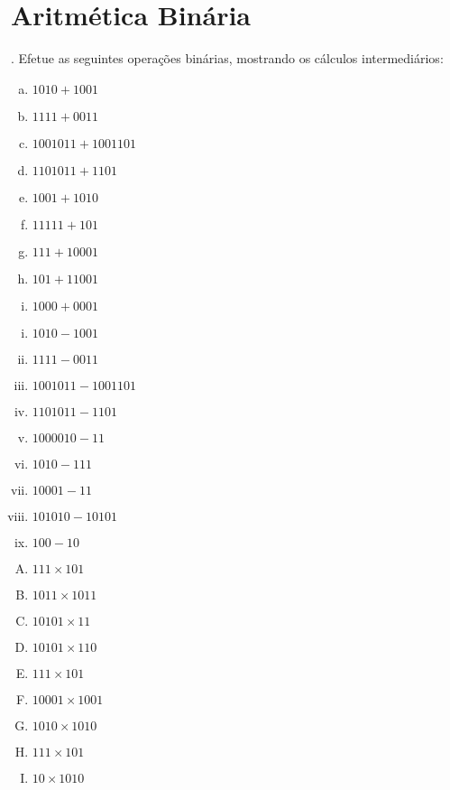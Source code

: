 
\section*{Aritmética Binária}

. Efetue as seguintes operações binárias, mostrando os 
cálculos intermediários:

\bigskip
\begin{minipage}[h]{.33\linewidth}
  \begin{enumerate}[a)]
  \item $1010+1001$
  \item $1111+0011$
  \item $1001011+1001101$
  \item $1101011+1101$
  \item $1001 + 1010$
  \item $11111 + 101$
  \item $111 + 10001$
  \item $101 + 11001$
  \item $1000 + 0001$
  \end{enumerate}
\end{minipage}
\begin{minipage}[h]{.33\linewidth}
  \begin{enumerate}[i)]
  \item $1010-1001$
  \item $1111-0011$
  \item $1001011-1001101$
  \item $1101011-1101$
  \item  $1000010 - 11$
  \item $1010 - 111$
  \item $10001 - 11$
  \item $101010 - 10101$
  \item $100 - 10$
  \end{enumerate}
\end{minipage}
\begin{minipage}[h]{.33\linewidth}
  \begin{enumerate}[A)]
  \item $111\times 101$
  \item $1011\times 1011$
  \item $10101\times 11$
  \item $10101\times 110$
  \item $111 \times 101$
  \item $10001 \times 1001$
  \item $1010 \times 1010$
  \item $111 \times 101$
  \item $10 \times 1010$
  \end{enumerate}
\end{minipage}
